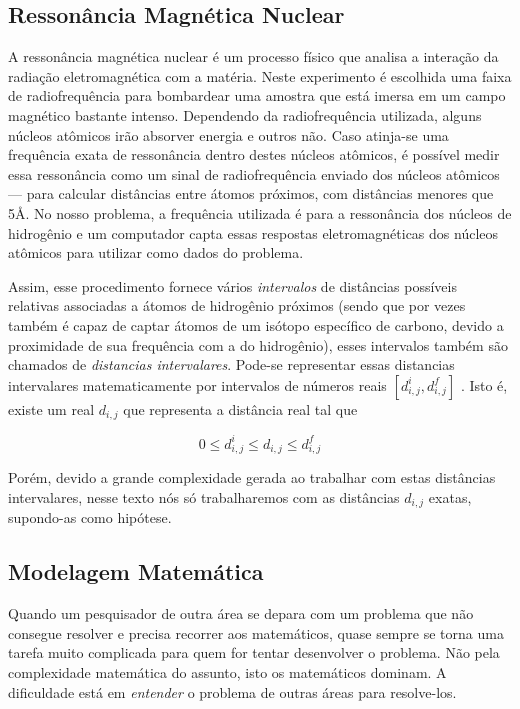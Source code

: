 \documentclass[a4paper,12pt]{article}
\begin{document}
	\subsection{Ressonância Magnética Nuclear}
	A ressonância magnética nuclear é um processo físico que analisa a interação da radiação eletromagnética com a matéria. Neste experimento é escolhida uma faixa de radiofrequência para bombardear uma amostra que está imersa em um campo magnético bastante intenso. Dependendo da radiofrequência utilizada, alguns núcleos atômicos irão absorver energia e outros não. Caso atinja-se uma frequência exata de ressonância dentro destes núcleos atômicos, é possível medir essa ressonância como um sinal de radiofrequência enviado dos núcleos atômicos --- para calcular distâncias entre átomos próximos, com distâncias menores que 5\AA. No nosso problema, a frequência utilizada é para a ressonância dos núcleos de hidrogênio e um computador capta essas respostas eletromagnéticas dos núcleos atômicos para utilizar como dados do problema. \cite{RMNBookIntroduction}
	
	Assim, esse procedimento fornece vários \textit{intervalos} de distâncias possíveis relativas associadas a átomos de hidrogênio próximos (sendo que por vezes também 
	é capaz de captar átomos de um isótopo específico de carbono, devido a proximidade de sua frequência com a do hidrogênio), esses intervalos também são chamados de \textit{distancias intervalares}. Pode-se representar essas distancias intervalares matematicamente por intervalos de números reais $[d_{i,j}^i, d_{i,j}^f]$ . Isto é, existe um real $d_{i,j}$ que representa a distância real tal que
	
	$$ 0 \leq d_{i,j}^i \leq d_{i,j} \leq d_{i,j}^f$$
	
	Porém, devido a grande complexidade gerada ao trabalhar com estas distâncias intervalares, nesse texto nós só trabalharemos com as distâncias $d_{i,j}$ exatas, supondo-as como hipótese.
	
	\subsection{Modelagem Matemática}
	Quando um pesquisador de outra área se depara com um problema que não consegue resolver e precisa recorrer aos matemáticos, quase sempre se torna uma tarefa muito complicada para quem for tentar desenvolver o problema. Não pela complexidade matemática do assunto, isto os matemáticos dominam. A dificuldade está em \textit{entender} o problema de outras áreas para resolve-los.
	
\end{document}

